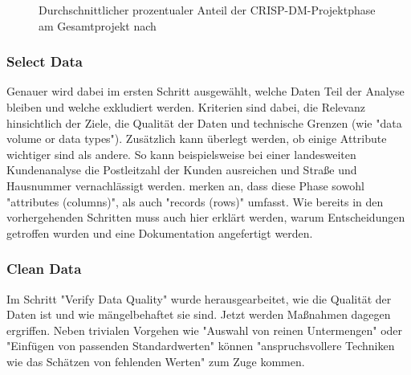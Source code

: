 \begin{figure}[H]
\centering
{}
\caption{Durchschnittlicher prozentualer Anteil der CRISP-DM-Projektphase am Gesamtprojekt nach \citep[S.~15; eigene Darstellung]{shearer_crisp-dm_2000}}
\label{fig:CRISP_DM_percent}
\end{figure}

\subsubsection{Select Data}
Genauer wird dabei im ersten Schritt ausgewählt, welche Daten Teil der Analyse bleiben und welche exkludiert werden. Kriterien sind dabei, die Relevanz hinsichtlich der Ziele, die Qualität der Daten und technische Grenzen\citep[S.~16]{shearer_crisp-dm_2000} (wie "data volume or data types"\citep[S.~21]{chapman_crisp-dm_2000}). Zusätzlich kann überlegt werden, ob einige Attribute wichtiger sind als andere. So kann beispielsweise bei einer landesweiten Kundenanalyse die Postleitzahl der Kunden ausreichen und Straße und Hausnummer vernachlässigt werden.\citep[S.~16]{shearer_crisp-dm_2000} \citep[S.21]{chapman_crisp-dm_2000} merken an, dass diese Phase sowohl "attributes (columns)", als auch "records (rows)" umfasst. Wie bereits in den vorhergehenden Schritten muss auch hier erklärt werden, warum Entscheidungen getroffen wurden und eine Dokumentation angefertigt werden.\citep[S.~16]{shearer_crisp-dm_2000}

\subsubsection{Clean Data}
Im Schritt "Verify Data Quality" wurde herausgearbeitet, wie die Qualität der Daten ist und wie mängelbehaftet sie sind. Jetzt werden Maßnahmen dagegen ergriffen. Neben trivialen Vorgehen wie "Auswahl von reinen Untermengen" oder "Einfügen von passenden Standardwerten" können "anspruchsvollere Techniken wie das Schätzen von fehlenden Werten"\citep[S.21; eigene Übersetzung]{chapman_crisp-dm_2000} zum Zuge kommen.

